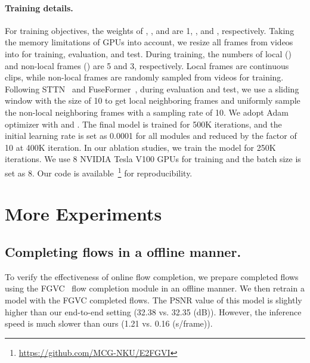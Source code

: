 \documentclass[final]{cvpr}
\begin{document}
\paragraph{Training details.}
For training objectives, the weights of , , and  are 1, , and , respectively.
Taking the memory limitations of GPUs into account, we resize all frames from videos into  for training, evaluation, and test.
During training, the numbers of local () and non-local frames () are 5 and 3, respectively.
Local frames are continuous clips, while non-local frames are randomly sampled from videos for training.
Following STTN~\cite{yan2020sttn} and FuseFormer~\cite{Liu_2021_FuseFormer}, during evaluation and test, we use a sliding window with the size of 10 to get local neighboring frames and uniformly sample the non-local neighboring frames with a sampling rate of 10.
We adopt Adam optimizer with  and .
The final model is trained for 500K iterations, and the initial learning rate is set as 0.0001 for all modules and reduced by the factor of 10 at 400K iteration.
In our ablation studies, we train the model for 250K iterations.
We use 8 NVIDIA Tesla V100 GPUs for training and the batch size is set as 8.
Our code is available~\footnote{\url{https://github.com/MCG-NKU/E2FGVI}} for reproducibility.

\section{More Experiments}

\subsection{Completing flows in a offline manner.} 
To verify the effectiveness of online flow completion, we prepare completed flows using the FGVC~\cite{Lai-ECCV-2018} flow completion module in an offline manner. 
We then retrain a model with the FGVC completed flows.
The PSNR value of this model is slightly higher than our end-to-end setting (32.38 vs. 32.35 (dB)).
However, the inference speed is much slower than ours (1.21 vs. 0.16 (s/frame)).
\end{document}
